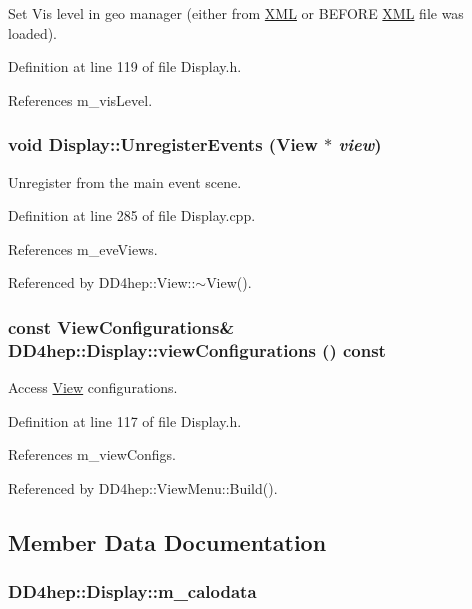 Set Vis level in geo manager (either from \hyperlink{namespace_d_d4hep_1_1_x_m_l}{XML} or BEFORE \hyperlink{namespace_d_d4hep_1_1_x_m_l}{XML} file was loaded). 

Definition at line 119 of file Display.h.

References m\_\-visLevel.\hypertarget{class_d_d4hep_1_1_display_ab681bf3f69e91271a5c8ec36fb991207}{
\subsubsection[{UnregisterEvents}]{\setlength{\rightskip}{0pt plus 5cm}void Display::UnregisterEvents ({\bf View} $\ast$ {\em view})}}
\label{class_d_d4hep_1_1_display_ab681bf3f69e91271a5c8ec36fb991207}


Unregister from the main event scene. 

Definition at line 285 of file Display.cpp.

References m\_\-eveViews.

Referenced by DD4hep::View::$\sim$View().\hypertarget{class_d_d4hep_1_1_display_a3d7c3cb7abd7bf12ba8ae4b5f391f2a6}{
\subsubsection[{viewConfigurations}]{\setlength{\rightskip}{0pt plus 5cm}const {\bf ViewConfigurations}\& DD4hep::Display::viewConfigurations () const}}
\label{class_d_d4hep_1_1_display_a3d7c3cb7abd7bf12ba8ae4b5f391f2a6}


Access \hyperlink{class_d_d4hep_1_1_view}{View} configurations. 

Definition at line 117 of file Display.h.

References m\_\-viewConfigs.

Referenced by DD4hep::ViewMenu::Build().

\subsection{Member Data Documentation}
\hypertarget{class_d_d4hep_1_1_display_a5f32c54601dd6e6a8556e6ffbafb10cc}{
\subsubsection[{m\_\-calodata}]{ {\bf DD4hep::Display::m\_\-calodata}}}
\label{class_d_d4hep_1_1_display_a5f32c54601dd6e6a8556e6ffbafb10cc}


